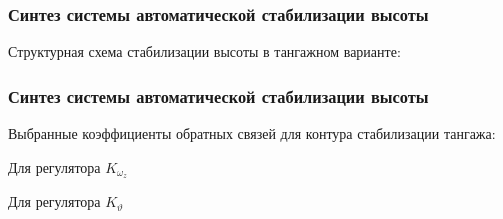 \documentclass{beamer}
\begin{document}
\begin{frame}
    \frametitle{Синтез системы автоматической стабилизации высоты}
    \begin{center}
        Структурная схема стабилизации высоты в тангажном варианте:
        \vspace{14pt}

        \resizebox{1.35\textwidth}{!}{}
    \end{center}

\end{frame}
\begin{frame}[t]
    \frametitle{Синтез системы автоматической стабилизации высоты}
    \begin{center}
        Выбранные коэффициенты обратных связей для контура стабилизации тангажа:
        \vspace{14pt}

        \begin{minipage}{0.45\textwidth}
            \begin{center}
                Для регулятора $K_{\omega_z}$\\
                \resizebox{\textwidth}{!}{}
            \end{center}
        \end{minipage}
        \hfill
        \begin{minipage}{0.45\textwidth}
            \begin{center}
                Для регулятора $K_{\vartheta}$\\
                \resizebox{\textwidth}{!}{}
            \end{center}
        \end{minipage}
    \end{center}
\end{frame}
\end{document}
